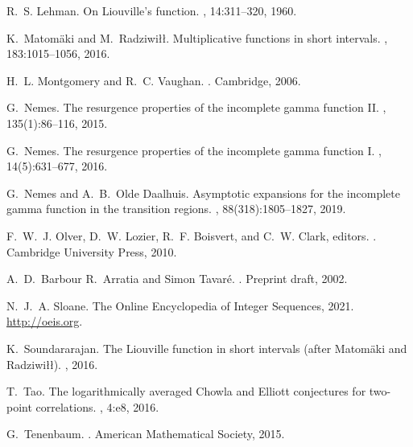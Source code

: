 \documentclass[11pt,reqno,a4letter]{article}
\numberwithin{equation}{section}
\numberwithin{figure}{section}
\numberwithin{table}{section}
\theoremstyle{plain}
\numberwithin{theorem}{section}
\theoremstyle{definition}
\begin{document}
\begin{thebibliography}{10}
R.~S. Lehman.
\newblock On {L}iouville's function.
, 14:311--320, 1960.

K.~Matom{\"{a}}ki and M.~Radziwi{\l\l}.
\newblock Multiplicative functions in short intervals.
, 183:1015--1056, 2016.

H.~L. Montgomery and R.~C. Vaughan.
.
\newblock Cambridge, 2006.

G.~Nemes.
\newblock The resurgence properties of the incomplete gamma function {II}.
, 135(1):86--116, 2015.

G.~Nemes.
\newblock The resurgence properties of the incomplete gamma function {I}.
, 14(5):631--677, 2016.

G.~Nemes and A.~B.~Olde Daalhuis.
\newblock Asymptotic expansions for the incomplete gamma function in the
  transition regions.
, 88(318):1805--1827, 2019.

F.~W.~J. Olver, D.~W. Lozier, R.~F. Boisvert, and C.~W. Clark, editors.
.
\newblock Cambridge University Press, 2010.

A.~D.~Barbour R.~Arratia and Simon Tavar{\'{e}}.
.
\newblock Preprint draft, 2002.

N.~J.~A. Sloane.
\newblock The {O}nline {E}ncyclopedia of {I}nteger {S}equences, 2021.
\newblock \url{http://oeis.org}.

K.~Soundararajan.
\newblock The {L}iouville function in short intervals (after {M}atom{\"{a}}ki
  and {R}adziwi{\l}{\l}).
, 2016.

T.~Tao.
\newblock The logarithmically averaged {C}howla and {E}lliott conjectures for
  two-point correlations.
, 4:e8, 2016.

G.~Tenenbaum.
.
\newblock American Mathematical Society, 2015.

\end{thebibliography}
\end{document}
